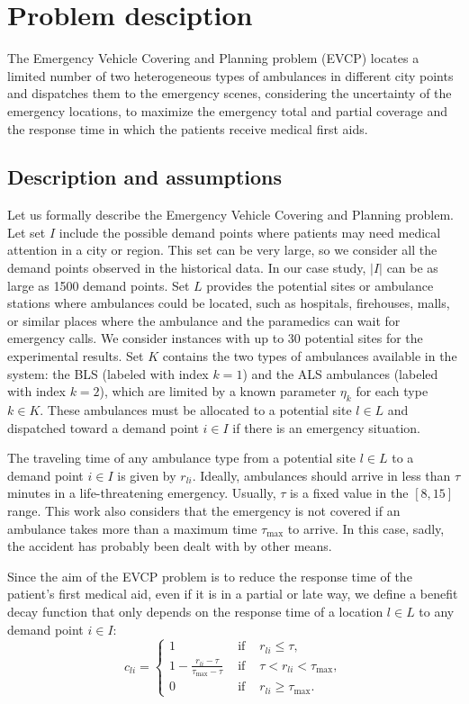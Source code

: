 \chapter{Problem desciption}\label{cap:problem}%
The Emergency Vehicle Covering and Planning problem (EVCP) locates a limited number of two heterogeneous types of ambulances in different city points and dis\-pat\-ches them to the emergency scenes, considering the uncertainty of the emergency locations, to maximize the emergency total and partial coverage and the response time in which the patients receive medical first aids.

\section{Description and assumptions}\label{sec:description}

Let us formally describe the Emergency Vehicle Covering and Planning problem.
Let set $I$ include the possible demand points where patients may need medical attention in a city or region. This set can be very large, so we consider all the demand points observed in the historical data. In our case study, $|I|$ can be as large as 1500 demand points. Set $L$ provides the potential sites or ambulance stations where ambulances could be located, such as hospitals, firehouses, malls, or similar places where the ambulance and the paramedics can wait for emergency calls. We consider instances with up to 30 potential sites for the experimental results. Set $K$ contains the two types of ambulances available in the system: the BLS (labeled with index $k=1$) and the ALS ambulances (labeled with index $k=2$), which are limited by a known parameter $\eta_k$ for each type $k \in K$. These ambulances must be allocated to a potential site $l \in L$ and dispatched toward a demand point $i \in I$ if there is an emergency situation. 

The traveling time of any ambulance type from a potential site $l \in L$ to a demand point $i \in I$ is given by $r_{li}$. Ideally, ambulances should arrive in less than $\tau$ minutes in a life-threatening emergency. Usually, $\tau$ is a fixed value in the $[8,15]$ range. This work also considers that the emergency is not covered if an ambulance takes more than a maximum time $\tau_{\max}$ to arrive. In this case, sadly, the accident has probably been dealt with by other means. 

Since the aim of the EVCP problem is to reduce the response time of the patient's first medical aid, even if it is in a partial or late way, we define a benefit  decay function that only depends on the response time of a location $l\in L$ to any demand point $i\in I$:
   \begin{equation*}
       c_{li} = \left\{ 
        \begin{array}{lcc} 
            1 & \text{ if } & r_{li} \leq \tau, \\ 
            1- \frac{r_{li}-\tau}{\tau_{\max} -\tau}  & \text{ if }  & \tau < r_{li} < \tau_{\max}, \\       
            0 &   \text{ if }  & r_{li} \geq \tau_{\max} .
    \end{array} \right.
   \end{equation*}


